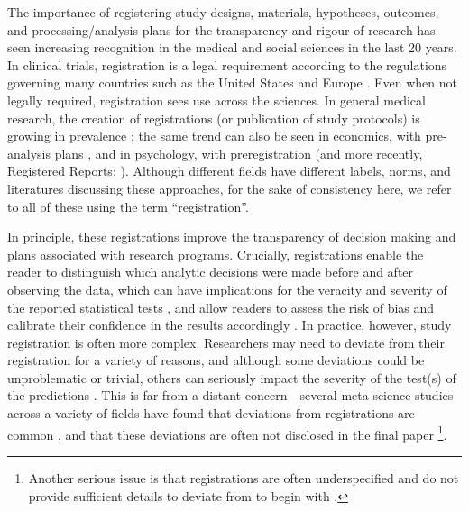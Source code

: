 \documentclass{article}
\begin{document}
The importance of registering study designs, materials, hypotheses, outcomes,
and processing/analysis plans for the transparency and rigour of research has
seen increasing recognition in the medical and social sciences in the last 20
years. In clinical trials, registration is a legal requirement according to the
regulations governing many countries such as the United States
\citep{noauthor_nih_nodate} and Europe \citep{noauthor_regulation_2014}. Even
when not legally required, registration sees use across the sciences. In general
medical research, the creation of registrations (or publication of study
protocols) is growing in prevalence \citep{tan_prevalence_2019}; the same trend
can also be seen in economics, with pre-analysis plans
\citep{ofosu_pre-analysis_2023}, and in psychology, with preregistration (and
more recently, Registered Reports; \citealp{chambers_past_2021,
hardwicke_prevalence_2024}). Although different fields have different labels,
norms, and literatures discussing these approaches, for the sake of consistency
here, we refer to all of these using the term ``registration''.

In principle, these registrations improve the transparency of decision making
and plans associated with research programs. Crucially, registrations enable the
reader to distinguish which analytic decisions were made before and after
observing the data, which can have implications for the veracity and severity of
the reported statistical tests \citep{kaplan_likelihood_2015}, and allow readers
to assess the risk of bias and calibrate their confidence in the results
accordingly \citep{hardwicke_reducing_2023}. In practice, however, study
registration is often more complex. Researchers may need to deviate from their
registration for a variety of reasons, and although some deviations could be
unproblematic or trivial, others can seriously impact the severity of the
test(s) of the predictions \citep{lakens_when_2024}. This is far from a distant
concern---several meta-science studies across a variety of fields have found
that deviations from registrations are common \citep{bakker_ensuring_2020,
claesen_comparing_2021, goldacre_compare_2019, hahn_cross-sectional_2025,
heirene_preregistration_2024, li_systematic_2018, ofosu_pre-analysis_2023,
poole_systematic_2025, targ_meta-research_group__collaborators_estimating_2023,
van_den_akker_selective_2023, van_den_akker_potential_2024}, and that these
deviations are often not disclosed in the final paper
\citep{targ_meta-research_group__collaborators_estimating_2023,
van_den_akker_selective_2023, van_den_akker_potential_2024}\footnote{Another
serious issue is that registrations are often underspecified and do not provide
sufficient details to deviate from to begin with \citep{bakker_ensuring_2020,
hahn_cross-sectional_2025, ofosu_pre-analysis_2023, poole_systematic_2025,
van_den_akker_potential_2024}.}.
\end{document}
